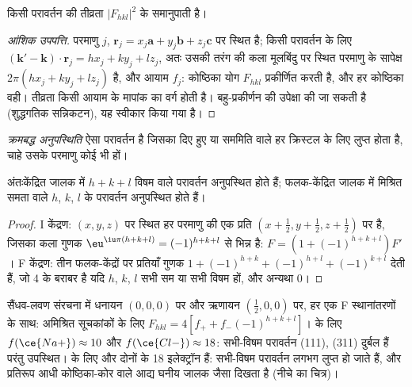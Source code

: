 \begin{proposition}[तीव्रता]\label{prop:b3:x-ray-diffraction:intensity}
किसी परावर्तन की तीव्रता $|F_{hkl}|^2$ के समानुपाती है।
\end{proposition}

\begin{proof}[आंशिक उपपत्ति]
परमाणु $j$, $\mathbf r_j = x_j\mathbf a + y_j\mathbf b + z_j\mathbf c$ पर स्थित है; किसी परावर्तन के लिए
$(\mathbf k' - \mathbf k)\cdot\mathbf r_j = hx_j + ky_j + lz_j$, अतः उसकी तरंग की कला
मूलबिंदु पर स्थित परमाणु के सापेक्ष $2\pi(hx_j + ky_j + lz_j)$ है, और आयाम $f_j$:
कोष्ठिका योग $F_{hkl}$ प्रकीर्णित करती है, और हर कोष्ठिका वही। तीव्रता किसी आयाम के
मापांक का वर्ग होती है। बहु-प्रकीर्णन की उपेक्षा की जा सकती है
(शुद्धगतिक सन्निकटन), यह स्वीकार किया गया है।
\end{proof}

\begin{definition}[क्रमबद्ध अनुपस्थिति]\label{def:b3:x-ray-diffraction:absence}
\emph{क्रमबद्ध अनुपस्थिति} ऐसा परावर्तन है जिसका
 दिए हुए  या सममिति वाले हर क्रिस्टल के लिए
लुप्त होता है, चाहे उसके परमाणु कोई भी हों।
\end{definition}

\begin{proposition}[केंद्रित जालकों की अनुपस्थितियाँ]\label{prop:b3:x-ray-diffraction:absences}
अंतःकेंद्रित जालक में $h + k + l$ विषम वाले परावर्तन अनुपस्थित होते हैं;
फलक-केंद्रित जालक में मिश्रित समता वाले $h$, $k$, $l$ के परावर्तन अनुपस्थित होते हैं।
\end{proposition}

\begin{proof}
I केंद्रण: $(x,y,z)$ पर स्थित हर परमाणु की एक प्रति $(x + \frac12, y + \frac12, z + \frac12)$ पर है,
जिसका कला गुणक $\eu^{\iu\pi(h+k+l)} = (-1)^{h+k+l}$ से भिन्न है: $F = (1 +
(-1)^{h+k+l})F'$। F केंद्रण: तीन फलक-केंद्रों पर प्रतियाँ गुणक $1 +
(-1)^{h+k} + (-1)^{h+l} + (-1)^{k+l}$ देती हैं, जो 4 के बराबर है यदि $h$, $k$, $l$ सभी सम या सभी विषम हों,
और अन्यथा 0।
\end{proof}

\begin{example}[सैंधव लवण और सिल्वाइट]\label{ex:b3:x-ray-diffraction:nacl-kcl}
सैंधव-लवण संरचना में धनायन $(0,0,0)$ पर और ऋणायन $(\frac12,0,0)$ पर, हर एक
F स्थानांतरणों के साथ: अमिश्रित सूचकांकों के लिए $F_{hkl} = 4[f_+ + f_-(-1)^{h+k+l}]$।
 के लिए $f(\ce{Na+}) \approx 10$ और $f(\ce{Cl-}) \approx 18$: सभी-विषम परावर्तन
(111), (311) दुर्बल हैं परंतु उपस्थित।  के लिए  और  दोनों के 18
इलेक्ट्रॉन हैं: सभी-विषम परावर्तन लगभग लुप्त हो जाते हैं, और प्रतिरूप आधी कोष्ठिका-कोर वाले
आद्य घनीय जालक जैसा दिखता है (नीचे का चित्र)।
\end{example}

